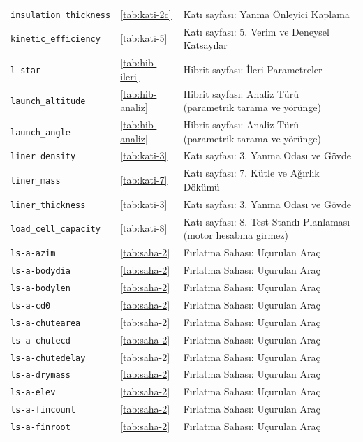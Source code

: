 \documentclass[11pt,a4paper]{article}
\begin{document}
{\begin{longtable}{@{}>{\raggedright\arraybackslash}p{5.2cm}p{1.4cm}>{\raggedright\arraybackslash}p{7.4cm}@{}}
\texttt{insulation\_\allowbreak{}thickness} & \ref{tab:kati-2c} & Katı sayfası: Yanma Önleyici Kaplama \\
\texttt{kinetic\_\allowbreak{}efficiency} & \ref{tab:kati-5} & Katı sayfası: 5. Verim ve Deneysel Katsayılar \\
\texttt{l\_\allowbreak{}star} & \ref{tab:hib-ileri} & Hibrit sayfası: İleri Parametreler \\
\texttt{launch\_\allowbreak{}altitude} & \ref{tab:hib-analiz} & Hibrit sayfası: Analiz Türü (parametrik tarama ve yörünge) \\
\texttt{launch\_\allowbreak{}angle} & \ref{tab:hib-analiz} & Hibrit sayfası: Analiz Türü (parametrik tarama ve yörünge) \\
\texttt{liner\_\allowbreak{}density} & \ref{tab:kati-3} & Katı sayfası: 3. Yanma Odası ve Gövde \\
\texttt{liner\_\allowbreak{}mass} & \ref{tab:kati-7} & Katı sayfası: 7. Kütle ve Ağırlık Dökümü \\
\texttt{liner\_\allowbreak{}thickness} & \ref{tab:kati-3} & Katı sayfası: 3. Yanma Odası ve Gövde \\
\texttt{load\_\allowbreak{}cell\_\allowbreak{}capacity} & \ref{tab:kati-8} & Katı sayfası: 8. Test Standı Planlaması (motor hesabına girmez) \\
\texttt{ls-a-azim} & \ref{tab:saha-2} & Fırlatma Sahası: Uçurulan Araç \\
\texttt{ls-a-bodydia} & \ref{tab:saha-2} & Fırlatma Sahası: Uçurulan Araç \\
\texttt{ls-a-bodylen} & \ref{tab:saha-2} & Fırlatma Sahası: Uçurulan Araç \\
\texttt{ls-a-cd0} & \ref{tab:saha-2} & Fırlatma Sahası: Uçurulan Araç \\
\texttt{ls-a-chutearea} & \ref{tab:saha-2} & Fırlatma Sahası: Uçurulan Araç \\
\texttt{ls-a-chutecd} & \ref{tab:saha-2} & Fırlatma Sahası: Uçurulan Araç \\
\texttt{ls-a-chutedelay} & \ref{tab:saha-2} & Fırlatma Sahası: Uçurulan Araç \\
\texttt{ls-a-drymass} & \ref{tab:saha-2} & Fırlatma Sahası: Uçurulan Araç \\
\texttt{ls-a-elev} & \ref{tab:saha-2} & Fırlatma Sahası: Uçurulan Araç \\
\texttt{ls-a-fincount} & \ref{tab:saha-2} & Fırlatma Sahası: Uçurulan Araç \\
\texttt{ls-a-finroot} & \ref{tab:saha-2} & Fırlatma Sahası: Uçurulan Araç \\

\end{longtable}}
\end{document}
